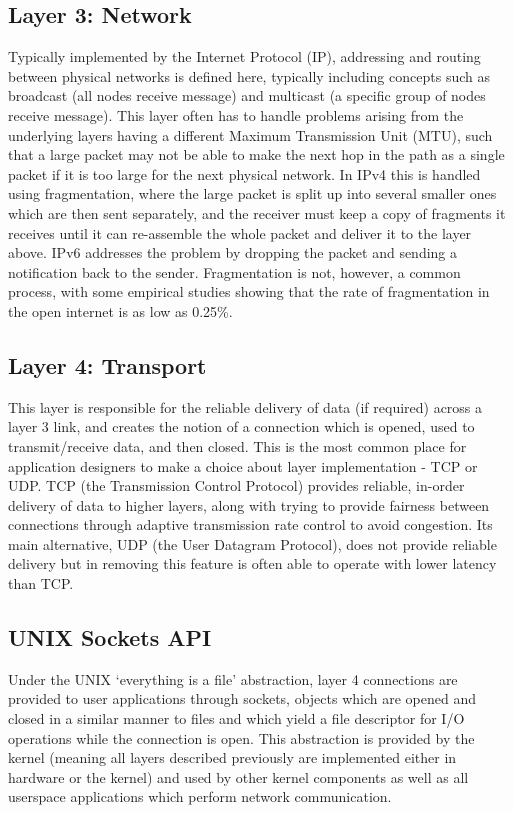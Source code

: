 \documentclass[a4paper,12pt,twoside,openright]{report}
\begin{document}
	\subsection{Layer 3: Network}
	Typically implemented by the Internet Protocol (IP), addressing and routing between physical networks is defined here, typically including concepts such as broadcast (all nodes receive message) and multicast (a specific group of nodes receive message). This layer often has to handle problems arising from the underlying layers having a different Maximum Transmission Unit (MTU), such that a large packet may not be able to make the next hop in the path as a single packet if it is too large for the next physical network. In IPv4 this is handled using fragmentation, where the large packet is split up into several smaller ones which are then sent separately, and the receiver must keep a copy of fragments it receives until it can re-assemble the whole packet and deliver it to the layer above. IPv6 addresses the problem by dropping the packet and sending a notification back to the sender. Fragmentation is not, however, a common process, with some empirical studies showing that the rate of fragmentation in the open internet is as low as 0.25\%.
	
	\subsection{Layer 4: Transport}
	This layer is responsible for the reliable delivery of data (if required) across a layer 3 link, and creates the notion of a connection which is opened, used to transmit/receive data, and then closed. This is the most common place for application designers to make a choice about layer implementation - TCP or UDP. TCP (the Transmission Control Protocol) provides reliable, in-order delivery of data to higher layers, along with trying to provide fairness between connections through adaptive transmission rate control to avoid congestion. Its main alternative, UDP (the User Datagram Protocol), does not provide reliable delivery but in removing this feature is often able to operate with lower latency than TCP.
	
	\subsection{UNIX Sockets API}
	Under the UNIX `everything is a file' abstraction, layer 4 connections are provided to user applications through sockets, objects which are opened and closed in a similar manner to files and which yield a file descriptor for I/O operations while the connection is open. This abstraction is provided by the kernel (meaning all layers described previously are implemented either in hardware or the kernel) and used by other kernel components as well as all userspace applications which perform network communication.
	
\end{document}
